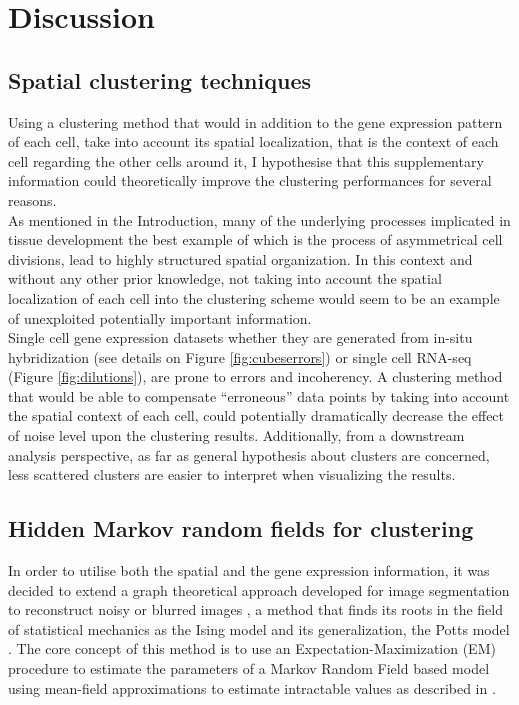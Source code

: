 \section{Discussion}
	\subsection{Spatial clustering techniques}
	Using a clustering method that would in addition to the gene expression pattern of each cell, take into account its spatial localization, that is the context of each cell regarding the other cells around it, I hypothesise that this supplementary information could theoretically improve the clustering performances for several reasons.\\
	
	As mentioned in the Introduction, many of the underlying processes implicated in tissue development the best example of which is the process of asymmetrical cell divisions, lead to highly structured spatial organization. In this context and without any other prior knowledge, not taking into account the spatial localization of each cell into the clustering scheme would seem to be an example of unexploited potentially important information. \\
	
	Single cell gene expression datasets whether they are generated from in-situ hybridization (see details on Figure \ref{fig:cubeserrors}) or single cell RNA-seq (Figure \ref{fig:dilutions}), are prone to errors and incoherency. A clustering method that would be able to compensate ``erroneous'' data points by taking into account the spatial context of each cell, could potentially dramatically decrease the effect of noise level upon the clustering results. Additionally, from a downstream analysis perspective, as far as general hypothesis about clusters are concerned, less scattered clusters are easier to interpret when visualizing the results.\\


	\subsection{Hidden Markov random fields for clustering}
In order to utilise both the spatial and the gene expression information, it was decided to extend a graph theoretical approach developed for image segmentation to reconstruct noisy or blurred images \citep{Dang98}, a method that finds its roots in the field of statistical mechanics as the Ising model \citep{Ising25} and its generalization, the Potts model \citep{Wu82}. The core concept of this method is to use an Expectation-Maximization (EM) procedure to estimate the parameters of a Markov Random Field based model using mean-field approximations to estimate intractable values as described in \citep{Celeux01}.\\

